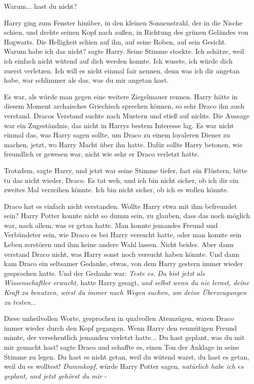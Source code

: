 \glqq Warum... hast du nicht?\grqq{}

Harry ging zum Fenster hinüber, in den kleinen Sonnenstrahl, der in die Nische
schien, und drehte seinen Kopf nach außen, in Richtung des grünen Geländes von
Hogwarts. Die Helligkeit schien auf ihn, auf seine Roben, auf sein Gesicht.
\glqq Warum habe ich das nicht?\grqq{} sagte Harry. Seine Stimme stockte. \glqq
Ich schätze, weil ich einfach nicht wütend auf dich werden konnte. Ich wusste,
ich würde dich zuerst verletzen. Ich will es nicht einmal fair nennen, denn was
ich dir angetan habe, war schlimmer als das, was du mir angetan hast.\grqq{}

Es war, als würde man gegen eine weitere Ziegelmauer rennen. Harry hätte in
diesem Moment archaisches Griechisch sprechen können, so sehr Draco ihn auch
verstand. Dracos Verstand suchte nach Mustern und stieß auf nichts. Die Aussage
war ein Zugeständnis, das nicht in Harrys bestem Interesse lag. Es war nicht
einmal das, was Harry sagen sollte, um Draco zu einem loyaleren Diener zu
machen, jetzt, wo Harry Macht über ihn hatte. Dafür sollte Harry betonen, wie
freundlich er gewesen war, nicht wie sehr er Draco verletzt hatte.

\glqq Trotzdem\grqq{}, sagte Harry, und jetzt war seine Stimme tiefer, fast ein
Flüstern, \glqq bitte tu das nicht wieder, Draco. Es tat weh, und ich bin nicht
sicher, ob ich dir ein zweites Mal verzeihen könnte. Ich bin nicht sicher, ob
ich es wollen könnte.\grqq{}

Draco hat es einfach nicht verstanden. Wollte Harry etwa mit ihm befreundet
sein? Harry Potter konnte nicht so dumm sein, zu glauben, dass das noch möglich
war, nach allem, was er getan hatte. Man konnte jemandes Freund und Verbündeter
sein, wie Draco es bei Harry versucht hatte, oder man konnte sein Leben
zerstören und ihm keine andere Wahl lassen. Nicht beides. Aber dann verstand
Draco nicht, was Harry sonst noch versucht haben könnte. Und dann kam Draco ein
seltsamer Gedanke, etwas, von dem Harry gestern immer wieder gesprochen hatte.
Und der Gedanke war: \emph{Teste es.} \emph{Du bist jetzt als Wissenschaftler
erwacht,} hatte Harry gesagt, \emph{und selbst wenn du nie lernst, deine Kraft
zu benutzen, wirst du immer nach Wegen suchen, um deine Überzeugungen zu
testen.}..

Diese unheilvollen Worte, gesprochen in qualvollen Atemzügen, waren Draco immer
wieder durch den Kopf gegangen. Wenn Harry den reumütigen Freund mimte, der
versehentlich jemanden verletzt hatte... \glqq Du hast geplant, was du mit mir
gemacht hast!\grqq{} sagte Draco und schaffte es, einen Ton der Anklage in seine
Stimme zu legen. \glqq Du hast es nicht getan, weil du wütend warst, du hast es
getan, weil du es wolltest!\grqq{} \emph{Dummkopf}, würde Harry Potter sagen,
\emph{natürlich habe ich es geplant, und jetzt gehörst du mir} -

